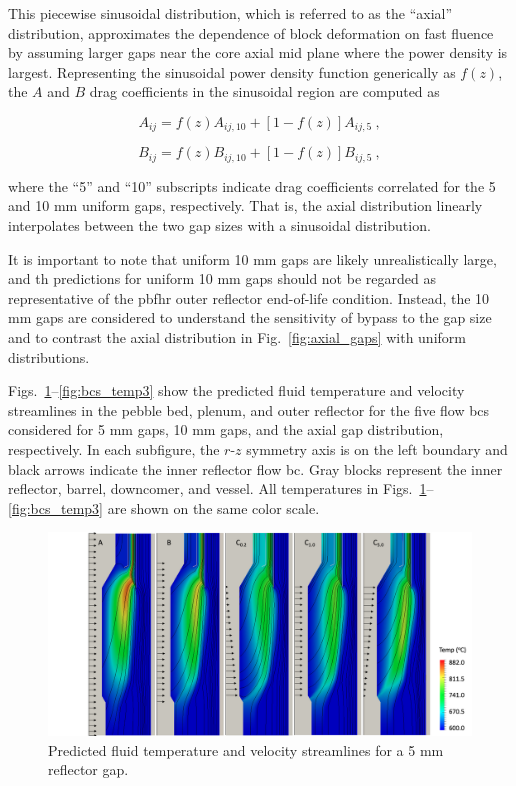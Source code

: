 This piecewise sinusoidal distribution, which is referred to as the ``axial'' distribution, approximates the dependence of block deformation on fast fluence by assuming larger gaps near the core axial mid plane where the power density is largest. Representing the sinusoidal power density function generically as \(f(z)\), the \(A\) and \(B\) drag coefficients in the sinusoidal region are computed as

\begin{equation}
A_{ij}=f(z)A_{ij,10}+\left\lbrack1-f(z)\right\rbrack A_{ij,5}\ ,
\end{equation}

\begin{equation}
B_{ij}=f(z)B_{ij,10}+\left\lbrack1-f(z)\right\rbrack B_{ij,5}\ ,
\end{equation}

\noindent where the ``5'' and ``10'' subscripts indicate drag coefficients correlated for the 5 and 10 \si{\milli\meter} uniform gaps, respectively. That is, the axial distribution linearly interpolates between the two gap sizes with a sinusoidal distribution. 

It is important to note that uniform 10 \si{\milli\meter} gaps are likely unrealistically large, and \gls{th} predictions for uniform 10 \si{\milli\meter} gaps should not be regarded as representative of the \gls{pbfhr} outer reflector end-of-life condition. Instead, the 10 \si{\milli\meter} gaps are considered to understand the sensitivity of bypass to the gap size and to contrast the axial distribution in Fig.\ \ref{fig:axial_gaps} with uniform distributions.

Figs.\ \ref{fig:bcs_temp}--\ref{fig:bcs_temp3} show the predicted fluid temperature and velocity streamlines in the pebble bed, plenum, and outer reflector for the five flow \glspl{bc} considered for 5 \si{\milli\meter} gaps, 10 \si{\milli\meter} gaps, and the axial gap distribution, respectively. In each subfigure, the $r$-$z$ symmetry axis is on the left boundary and black arrows indicate the inner reflector flow \gls{bc}. Gray blocks represent the inner reflector, barrel, downcomer, and vessel. All temperatures in Figs.\ \ref{fig:bcs_temp}--\ref{fig:bcs_temp3} are shown on the same color scale.

\begin{figure}[!htb]
\centering
\includegraphics[width=0.85\linewidth]{figs/fluid_temp_05.png}
\caption{Predicted fluid temperature and velocity streamlines for a 5 \si{\milli\meter} reflector gap.}
\label{fig:bcs_temp}
\end{figure}

